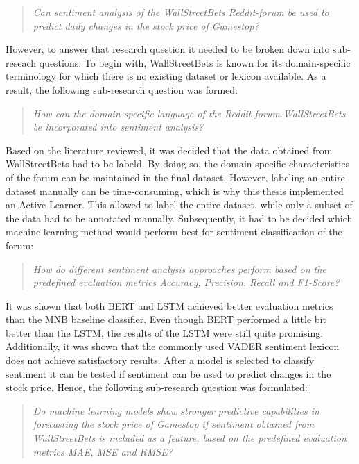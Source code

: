\documentclass[11pt, a4paper]{article}
\begin{document}
\begin{quote}
    \emph{Can sentiment analysis of the WallStreetBets Reddit-forum be used to predict daily changes in the stock price of Gamestop?}
\end{quote}

However, to answer that research question it needed to be broken down into sub-reseach questions. To begin with, WallStreetBets
is known for its domain-specific terminology for which there is no existing dataset or lexicon available. As a result, the following
sub-research question was formed:

\begin{quote}
    \emph{How can the domain-specific language of the Reddit forum WallStreetBets be incorporated into sentiment analysis?}
\end{quote}

Based on the literature reviewed, it was decided that the data obtained from WallStreetBets had to be labeld. By doing so,
the domain-specific characteristics of the forum can be maintained in the final dataset.
However, labeling an entire dataset manually can be
time-consuming, which is why this thesis implemented an Active Learner. This allowed to label the entire dataset, while only
a subset of the data had to be annotated manually. 
Subsequently, it had to be decided which machine learning method would perform best for sentiment classification of the forum:

\begin{quote}
    \emph{How do different sentiment analysis approaches perform based on the predefined evaluation metrics Accuracy, Precision, Recall and F1-Score?}
\end{quote}

It was shown that both BERT and LSTM achieved better evaluation metrics than the MNB baseline classifier. Even though
BERT performed a little bit better than the LSTM, the results of the LSTM were still quite promising. Additionally, it was shown
that the commonly used VADER sentiment lexicon does not achieve satisfactory results. After a model is selected to classify sentiment
it can be tested if sentiment can be used to predict changes in the stock price. Hence, the following sub-research question was formulated:

\begin{quote}
    \emph{Do machine learning models show stronger predictive capabilities in forecasting the stock price of Gamestop if sentiment obtained from WallStreetBets is included as a feature, based on the predefined evaluation metrics MAE, MSE and RMSE?}
\end{quote}
\end{document}
